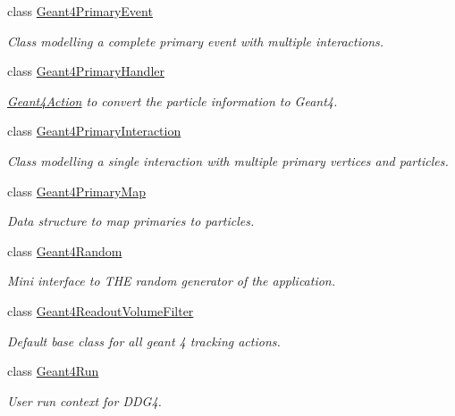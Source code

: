 \begin{DoxyCompactItemize}
class \hyperlink{class_d_d4hep_1_1_simulation_1_1_geant4_primary_event}{Geant4\+Primary\+Event}
\begin{DoxyCompactList}\small\item\em Class modelling a complete primary event with multiple interactions. \end{DoxyCompactList}\item 
class \hyperlink{class_d_d4hep_1_1_simulation_1_1_geant4_primary_handler}{Geant4\+Primary\+Handler}
\begin{DoxyCompactList}\small\item\em \hyperlink{class_d_d4hep_1_1_simulation_1_1_geant4_action}{Geant4\+Action} to convert the particle information to Geant4. \end{DoxyCompactList}\item 
class \hyperlink{class_d_d4hep_1_1_simulation_1_1_geant4_primary_interaction}{Geant4\+Primary\+Interaction}
\begin{DoxyCompactList}\small\item\em Class modelling a single interaction with multiple primary vertices and particles. \end{DoxyCompactList}\item 
class \hyperlink{class_d_d4hep_1_1_simulation_1_1_geant4_primary_map}{Geant4\+Primary\+Map}
\begin{DoxyCompactList}\small\item\em Data structure to map primaries to particles. \end{DoxyCompactList}\item 
class \hyperlink{class_d_d4hep_1_1_simulation_1_1_geant4_random}{Geant4\+Random}
\begin{DoxyCompactList}\small\item\em Mini interface to T\+HE random generator of the application. \end{DoxyCompactList}\item 
class \hyperlink{class_d_d4hep_1_1_simulation_1_1_geant4_readout_volume_filter}{Geant4\+Readout\+Volume\+Filter}
\begin{DoxyCompactList}\small\item\em Default base class for all geant 4 tracking actions. \end{DoxyCompactList}\item 
class \hyperlink{class_d_d4hep_1_1_simulation_1_1_geant4_run}{Geant4\+Run}
\begin{DoxyCompactList}\small\item\em User run context for D\+D\+G4. \end{DoxyCompactList}\item 

\end{DoxyCompactItemize}
